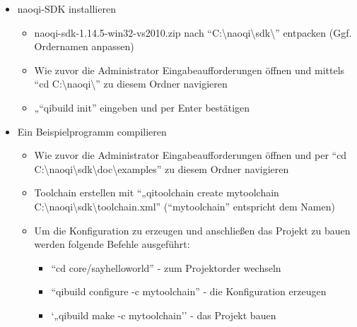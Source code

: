 \begin{itemize}
                \item naoqi-SDK installieren

                \begin{itemize}
                    \item naoqi-sdk-1.14.5-win32-vs2010.zip nach
                        ``C:\textbackslash{}naoqi\textbackslash{}sdk\textbackslash{}''
                        entpacken (Ggf. Ordernamen anpassen)

                    \item Wie zuvor die Administrator Eingabeaufforderungen
                        öffnen und mittels
                        ``cd C:\textbackslash{}naoqi\textbackslash{}''
                        zu diesem Ordner navigieren

                    \item„``qibuild init'' eingeben und per Enter bestätigen
                \end{itemize}

                \item Ein Beispielprogramm compilieren

                \begin{itemize}
                    \item Wie zuvor die Administrator Eingabeaufforderungen
                        öffnen und per
                        ``cd C:\textbackslash{}naoqi\textbackslash{}sdk\textbackslash{}doc\textbackslash{}examples''
                        zu diesem Ordner navigieren

                    \item Toolchain erstellen mit
                        ``„qitoolchain create mytoolchain C:\textbackslash{}naoqi\textbackslash{}sdk\textbackslash{}toolchain.xml''
                        (``mytoolchain'' entspricht dem Namen)

                    \item Um die Konfiguration zu erzeugen und anschließen das
                        Projekt zu bauen werden folgende Befehle ausgeführt:
                    \begin{itemize}
                        \item ``cd core/sayhelloworld'' - zum Projektorder
                            wechseln

                        \item ``qibuild configure -c mytoolchain'' - die
                            Konfiguration erzeugen

                        \item `„qibuild make -c mytoolchain'' - das Projekt
                            bauen
                    \end{itemize}

                \end{itemize}

            \end{itemize}

